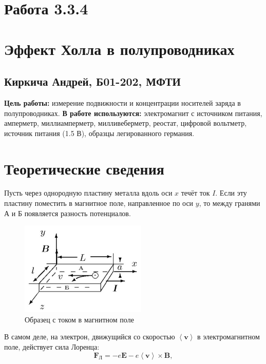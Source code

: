 



\section*{Работа 3.3.4}	
\section*{Эффект Холла в полупроводниках}
\subsection*{Киркича Андрей, Б01-202, МФТИ}
\n
\textbf{Цель работы:} измерение подвижности и концентрации носителей заряда в полупроводниках.
\n\n
\textbf{В работе используются:} электромагнит с источником питания, амперметр, миллиамперметр, милливеберметр, реостат, цифровой вольтметр, источник питания (1.5 В), образцы легированного германия.


\section*{Теоретические сведения}

Пусть через однородную пластину металла вдоль оси $ x $ течёт ток $ I $. Если эту пластину поместить в магнитное поле, направленное по оси $ y $, то между гранями А и Б появляется разность потенциалов.

\begin{figure}
	\includegraphics[width=6cm]{holl.jpg}
	\caption{Образец с током в магнитном поле}
	\label{ris1}
	\vspace{1.5cm}
\end{figure}

\n
В самом деле, на электрон, движущийся со скоростью $ \left\langle \bm{v} \right\rangle $ в электромагнитном поле, действует сила Лоренца:
\[ \bm{F_{\text{Л}}} = -e \bm{E} - e \left\langle \bm{v} \right\rangle \times \bm{B} ,\]

